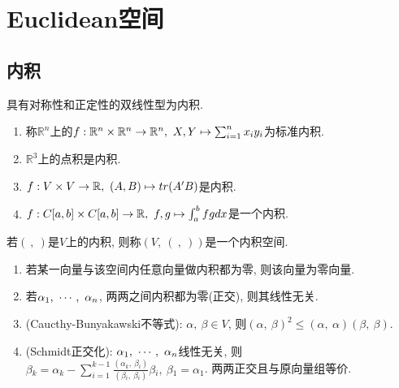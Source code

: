 

\chapter{ Euclidean空间 }

\section{ 内积 }

\begin{definition}[内积]
    具有对称性和正定性的双线性型为内积.
\end{definition}

\begin{example}
    \par
    \begin{enumerate}[itemindent=1em]
        \item 称$\mathbb{R}^n$上的$f: \mathbb{R}^n\times \mathbb{R}^n \to \mathbb{R}^n,\ X,Y \mapsto \sum_{i=1}^nx_iy_i$为标准内积.
        \item $\mathbb{R}^3$上的点积是内积.
        \item $f: V\times V \to \mathbb{R},\ (A,B) \mapsto tr(A'B)$是内积.
        \item $f: C[a,b]\times C[a,b] \to \mathbb{R},\ f,g \mapsto \int_a^bfgdx$是一个内积.
    \end{enumerate}
\end{example}

\begin{definition}[内积空间]
    若$(\ ,\ )$是$V$上的内积, 则称$(V,\ (\ ,\ ))$是一个内积空间.
\end{definition}


\begin{property}
    \par
    \begin{enumerate}[itemindent=1em]
        \item 若某一向量与该空间内任意向量做内积都为零, 则该向量为零向量.
        \item 若${\alpha}{_1},\ \cdots,\ {\alpha}{_{n}}$, 两两之间内积都为零(正交), 则其线性无关.
        \item (Caucthy-Bunyakawski不等式): $\alpha,\ \beta \in V$, 则$(\alpha,\ \beta)^2\le (\alpha,\ \alpha)(\beta,\ \beta)$.
        \item (Schmidt正交化): ${\alpha}{_1},\ \cdots,\ {\alpha}{_{n}}$线性无关, 
        则$\beta{_k}=\alpha{_k}-\sum_{i=1}^{k-1}\frac{(\alpha{_k},\ \beta{_i})}{(\beta{_i},\ \beta{_i})}\beta{_i},\ \beta{_1}=\alpha{_1}$. 两两正交且与原向量组等价.
    \end{enumerate}
\end{property}

